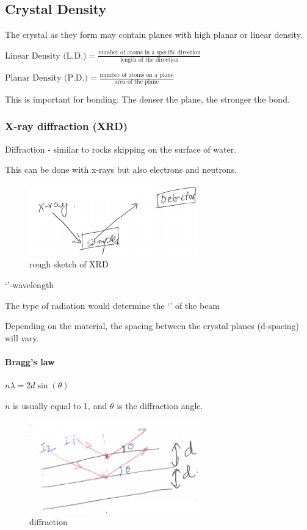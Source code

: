 \documentclass{article}
\begin{document}
\subsection{Crystal Density}
The crystal as they form may contain planes with high planar or linear density.

$\text{Linear Density (L.D.)} = \frac{\text{number of atoms in a specific direction}}{\text{length of the direction}}$

$\text{Planar Density (P.D.)} = \frac{\text{number of atoms on a plane}}{\text{area of the plane}}$

This is important for bonding. The denser the plane, the stronger the bond.

\subsubsection{X-ray diffraction (XRD)}
Diffraction - similar to rocks skipping on the surface of water.

This can be done with x-rays but also electrons and neutrons.
\begin{figure}[h!]
	\centering
	\includegraphics[width=0.66\textwidth]{assets/4e47d9c5.png}
	\caption{rough sketch of XRD}
\end{figure}

`\textlambda'-wavelength

The type of radiation would determine the `\textlambda' of the beam

Depending on the material, the spacing between the crystal planes (d-spacing) will vary.

\paragraph{Bragg's law} $n\lambda=2d\sin(\theta)$

$n$ is usually equal to 1, and $\theta$ is the diffraction angle.
\begin{figure}[h!]
	\centering
	\includegraphics[width=0.66\textwidth]{assets/7e865405.png}
	\caption{diffraction}
\end{figure}
\end{document}
